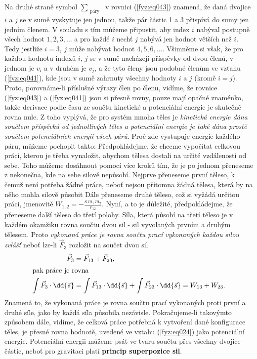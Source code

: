     Na druhé straně symbol \(\sum_{\substack{\text{páry}}}\)  v rovnici (\ref{fyz:eq043}) znamená, 
    že daná dvojice \(i\) a \(j\) se v sumě vyskytuje jen jednou, takže pár částic \num{1} a 
    \num{3} přispívá do sumy jen jedním členem. V souladu s tím můžeme připustit, aby index \(i\) 
    nabýval postupně všech hodnot \(1, 2, 3, \ldots\) a pro každé \(i\) nechť \(j\) nabývá jen 
    hodnot větších než \(i\). Tedy jestliže \(i = 3\), \(j\) může nabývat hodnot \(4, 5, 6, 
    \ldots\). Všimněme si však, že pro každou hodnotu indexů \(i\), \(j\) se v sumě nacházejí 
    příspěvky od dvou členů, v jednom je \(v_i\) a v druhém je \(v_j\), a že tyto členy jsou 
    podobné členům ve vztahu  (\ref{fyz:eq041}), kde jsou v sumě zahrnuty všechny hodnoty \(i\) a 
    \(j\) (kromě \(i=j\)). Proto, porovnáme-li příslušné výrazy člen po členu, vidíme, že rovnice  
    (\ref{fyz:eq043}) a  (\ref{fyz:eq041}) jsou si přesně rovny, pouze mají opačné znaménko, takže 
    derivace podle času ze součtu kinetické a potenciální energie je skutečně rovna nule. Z toho 
    vyplývá, že pro systém mnoha těles je \emph{kinetická energie dána součtem příspěvků od 
    jednotlivých těles a potenciální energie je také dána prostě součtem potenciálních energií 
    všech párů}. Proč zde vystupuje energie každého páru, můžeme pochopit takto: Předpokládejme, že 
    chceme vypočítat celkovou práci, kterou je třeba vynaložit, abychom tělesa dostali na určité 
    vzdálenosti od sebe. Toho můžeme dosáhnout pomocí více kroků tím, že je po jednom přeneseme z 
    nekonečna, kde na sebe silově nepůsobí. Nejprve přeneseme první těleso, k čemuž není potřeba 
    žádné práce, neboť nejsou přítomna žádná tělesa, která by na něho mohla silově působit Dále 
    přeneseme druhé těleso, což si vyžádá určitou práci, jmenovitě \(W_{1,2} = - 
    \frac{\kappa\,m_1\,m_2}{r_{12}}\). Nyní, a to je důležité, předpokládejme, že přeneseme další 
    těleso do třetí polohy. Síla, která působí na třetí těleso je v každém okamžiku rovna součtu 
    dvou sil - sil vyvolaných prvním a druhým tělesem. Proto \emph{vykonaná práce je rovna součtu 
    prací vykonaných každou silou zvlášť} neboť lze-li \(\vec{F}_3\) rozložit na součet dvou sil
    \begin{align*}
     \vec{F}_3 &= \vec{F}_{13} + \vec{F}_{23},        \\
      \shortintertext{pak práce je rovna}
      \int\vec{F}_3\cdot\dd{\vec{s}} 
                &=  \int\vec{F}_{13}\cdot\dd{\vec{s}} + 
                    \int\vec{F}_{23}\cdot\dd{\vec{s}}
                 = W_{13} + W_{23}. 
    \end{align*}
    Znamená to, že vykonaná práce je rovna součtu prací vykonaných proti první a druhé síle, jako 
    by každá síla působila nezávisle. Pokračujeme-li takovýmto způsobem dále, vidíme, že celková 
    práce potřebná k vytvoření dané konfigurace těles, je přesné rovna hodnotě, uvedené ve vztahu 
    (\ref{fyz:eq024}) jako potenciální energie. Potenciální energii můžeme psát ve tvaru součtu 
    přes všechny dvojice částic, neboť pro gravitaci platí \textbf{princip superpozice sil}.
    
